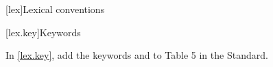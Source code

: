 \setcounter{chapter}{4}
[lex]{Lexical conventions}

\setcounter{section}{10}
[lex.key]{Keywords}

In \ref{lex.key}, add the keywords  and
 to Table 5 in the \Cpp Standard.

